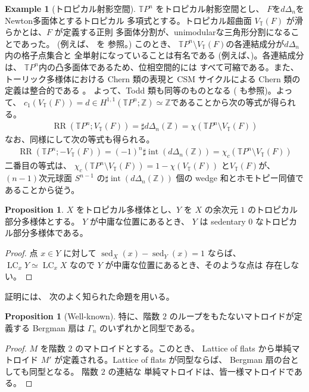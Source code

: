\documentclass[a4paper,dvipdfmx,reqno,12pt]{amsart}
\theoremstyle{definition}
\newtheorem{example}[theorem]{Example}
\newtheorem{proposition}[theorem]{Proposition}
\newcommand{\opn}[1]{\operatorname{#1}}
\numberwithin{equation}{section}
\begin{document}
\begin{example}[{トロピカル射影空間}]
\label{example-TPn}
$\mathbb{T}P^{n}$ をトロピカル射影空間とし、
$F$を$d\Delta_{n}$をNewton多面体とするトロピカル
多項式とする。トロピカル超曲面 
$V_{\mathbb{T}}(F)$ が滑らかとは、$F$ が定義する正則
多面体分割が、unimodularな三角形分割になることであった。
(例えば、\cite[]{MR3287221} を
参照。)
このとき、
$\mathbb{T}P^{n}\setminus
V_{\mathbb{T}}(F)$の各連結成分が$d\Delta_n$内の格子点集合と
全単射になっていることは有名である
(例えば、\cite[Proposition 3.1.6]{MR3287221})。各連結成分は、
$\mathbb{T}P^{n}$内の凸多面体であるため、位相空間的には
すべて可縮である。また、
トーリック多様体における Chern 類の表現と
CSM サイクルによる Chern 類の定義は整合的である
\cite[Proposition 13.1.2]{MR2810322}。
よって、Todd 類も同等のものとなる
(\cite[Theorem 13.1.6]{MR2810322} も参照)。よって、
$c_1(V_{\mathbb{T}}(F))=d\in H^{1,1}(\mathbb{T}P^{n};
\mathbb{Z})
\simeq \mathbb{Z}$であることから次の等式が得られる。
\begin{align}
\opn{RR}(\mathbb{T}P^{n};V_{\mathbb{T}}(F))=
\sharp d\Delta_n(\mathbb{Z})=
\chi(\mathbb{T}P^{n}\setminus
V_{\mathbb{T}}(F))
\end{align}
なお、同様にして次の等式も得られる。
\begin{align}
\opn{RR}(\mathbb{T}P^{n};-V_{\mathbb{T}}(F))=
(-1)^{n}\sharp \opn{int}(d\Delta_n(\mathbb{Z}))=
\chi_{c}(\mathbb{T}P^{n}\setminus
V_{\mathbb{T}}(F))   
\end{align}
二番目の等式は、
$\chi_{c}(\mathbb{T}P^{n}\setminus
V_{\mathbb{T}}(F))=1-\chi (V_{\mathbb{T}}(F))$
と$V_{\mathbb{T}}(F)$が、$(n-1)$次元球面
$S^{n-1}$ 
の$\sharp \opn{int}(d\Delta_n(\mathbb{Z}))$
個の wedge 和とホモトピー同値であることから従う。
\end{example}

\begin{proposition}
$X$ をトロピカル多様体とし、$Y$ を
$X$ の余次元 $1$
のトロピカル部分多様体とする。
$Y$ が中庸な位置にあるとき、
$Y$ は sedentary 0 なトロピカル部分多様体である。
\end{proposition}
\begin{proof}
点 $x\in Y$ に対して
$\opn{sed}_X(x)-\opn{sed}_Y(x)=1$ ならば、
$\opn{LC}_xY\simeq \opn{LC}_x X$ なので
$Y$ が中庸な位置にあるとき、そのような点は
存在しない。
\end{proof}

証明には、
次のよく知られた命題を用いる。
\begin{proposition}[{Well-known}]


特に、階数 $2$ のループをもたないマトロイドが定義する
Bergman 扇は $\Gamma_n$ のいずれかと同型である。
\end{proposition}
\begin{proof}
$M$ を階数 $2$ のマトロイドとする。このとき、
Lattice of flats から単純マトロイド
$M'$ が定義される。Lattice of flats が同型ならば、
Bergman 扇の台としても同型となる。
階数 $2$ の連結な
単純マトロイドは、皆一様マトロイドである。
\end{proof}
\end{document}
